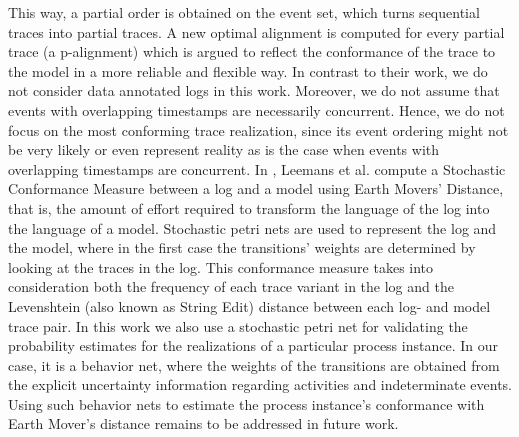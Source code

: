 This way, a partial order is obtained on the event set, which turns sequential traces into partial traces.
A new optimal alignment is computed for every partial trace (a p-alignment) which is argued to reflect the conformance of the trace to the model in a more reliable and flexible way.
In contrast to their work, we do not consider data annotated logs in this work.
Moreover, we do not assume that events with overlapping timestamps are necessarily concurrent.
Hence, we do not focus on the most conforming trace realization, since its event ordering might not be very likely or even represent reality as is the case when events with overlapping timestamps are concurrent.
In \cite{earth}, Leemans et al. compute a Stochastic Conformance Measure between a log and a model using Earth Movers' Distance, that is, the amount of effort required to transform the language of the log into the language of a model.
Stochastic petri nets are used to represent the log and the model, where in the first case the transitions' weights are determined by looking at the traces in the log.
This conformance measure takes into consideration both the frequency of each trace variant in the log and the Levenshtein (also known as String Edit) distance between each log- and model trace pair.
In this work we also use a stochastic petri net for validating the probability estimates for the realizations of a particular process instance.
In our case, it is a behavior net, where the weights of the transitions are obtained from the explicit uncertainty information regarding activities and indeterminate events.
Using such behavior nets to estimate the process instance's conformance with Earth Mover's distance remains to be addressed in future work.